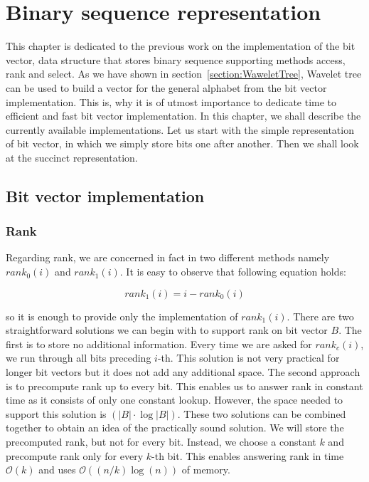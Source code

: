 \chapter{Binary sequence representation}
\label{kap:kap2}

This chapter is dedicated to the previous work on the implementation of the bit vector, data
structure that stores binary sequence supporting methods access, rank and select. As we have
shown in section~\ref{section:WaweletTree}, Wavelet tree can be used to build a vector
for the general alphabet from the bit vector implementation. This is, why it is of utmost
importance to dedicate time to efficient and fast bit vector implementation. In this
chapter, we shall describe the currently available implementations. Let us start with
the simple representation of bit vector, in which we simply store bits one after another.
Then we shall look at the succinct representation.

\section{Bit vector implementation}

\subsection{Rank}
\label{section:rank}

Regarding rank, we are concerned in fact in two different methods namely $rank_0(i)$ and
$rank_1(i)$. It is easy to observe that following equation holds:

                    $$rank_1(i) = i - rank_0(i)$$

so it is enough to provide only the implementation of $rank_1(i)$.
There are two straightforward solutions we can begin with to support rank on bit vector
$B$. The first is to store no additional information. Every time we are asked
for $rank_c(i)$, we run through all bits preceding $i$-th. This solution is not very
practical for longer bit vectors but it does not add any additional space. The second
approach is to precompute rank up to every bit. This enables us to answer rank in constant
time as it consists of only one constant lookup. However, the space needed to support this
solution is $(|B|\cdot\log |B|)$. These two solutions can be combined together to obtain an
idea of the practically sound solution. We will store the precomputed rank, but not for every
bit. Instead, we choose a constant $k$ and precompute rank only for every $k$-th bit. This
enables answering rank in time $\mathcal{O}(k)$ and uses $\mathcal{O}((n/k)\log(n))$ of memory.

